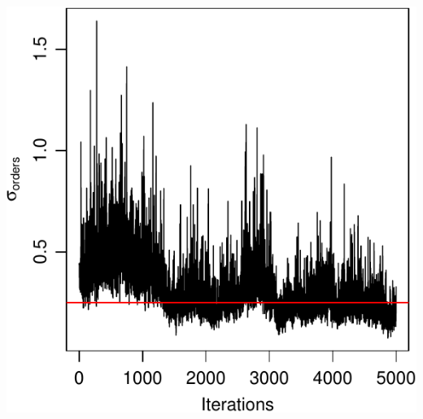 \documentclass[]{article}
\begin{document}
\begin{center}\includegraphics{modelDerivation_normPrior_files/figure-latex/fig_sigOrd-1} \end{center}
\end{document}
